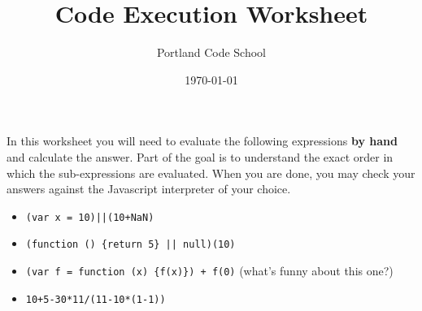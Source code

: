 \documentclass[11pt]{article}
\author{Portland Code School}
\date{\today}
\title{Code Execution Worksheet}
\begin{document}
\maketitle
In this worksheet you will need to evaluate the following expressions \textbf{by hand} and calculate the answer. Part of the goal is to understand the exact order in which the sub-expressions are evaluated. When you are done, you may check your answers against the Javascript interpreter of your choice.

\begin{itemize}
\item \verb~(var x = 10)||(10+NaN)~
\end{itemize}
\vspace{2 in}
\begin{itemize}
\item \verb~(function () {return 5} || null)(10)~
\end{itemize}
\vspace{2 in}
\begin{itemize}
\item \verb~(var f = function (x) {f(x)}) + f(0)~ (what's funny about this one?)
\end{itemize}
\vspace{2 in}
\begin{itemize}
\item \verb~10+5-30*11/(11-10*(1-1))~
\end{itemize}
\end{document}
